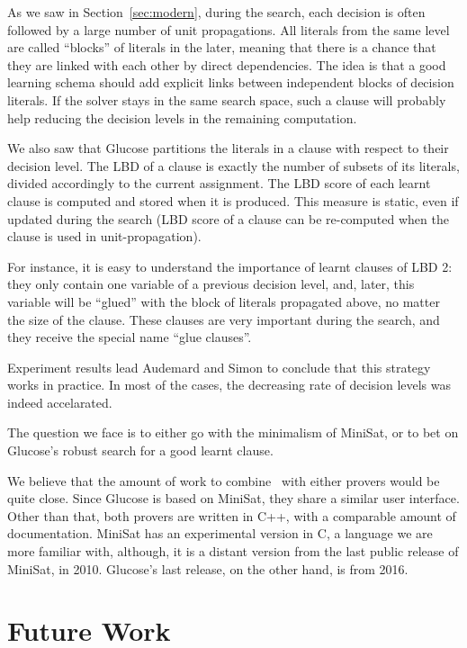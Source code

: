 As we saw in Section~\ref{sec:modern}, during the search, each decision is often
followed by a large number of unit propagations. All literals from the same
level are called ``blocks'' of literals in the later, meaning that there is a
chance that they are linked with each other by direct dependencies. The idea is
that a good learning schema should add explicit links between independent blocks
of decision literals. If the solver stays in the same search space, such a
clause will probably help reducing the decision levels in the remaining
computation.

We also saw that Glucose partitions the literals in a clause with respect to
their decision level. The LBD of a clause is exactly the number of subsets of
its literals, divided accordingly to the current assignment. The LBD score of
each learnt clause is computed and stored when it is produced. This measure is
static, even if updated during the search (LBD score of a clause can be
re-computed when the clause is used in unit-propagation). 

For instance, it is easy to understand the importance of learnt clauses of LBD
2: they only contain one variable of a previous decision level, and, later, this
variable will be ``glued'' with the block of literals propagated above, no
matter the size of the clause. These clauses are very important during the
search, and they receive the special name ``glue clauses''.

Experiment results lead Audemard and Simon to conclude that this strategy
works in practice. In most of the cases, the decreasing rate of decision
levels was indeed accelarated.

The question we face is to either go with the minimalism of MiniSat, or to
bet on Glucose's robust search for a good learnt clause.

We believe that the amount of work to combine \ksp~with either provers would be
quite close. Since Glucose is based on MiniSat, they share a similar user
interface. Other than that, both provers are written in C++, with a comparable
amount of documentation. MiniSat has an experimental version in C, a language we
are more familiar with, although, it is a distant version from the last public
release of MiniSat, in 2010. Glucose's last release, on the other hand, is from
2016. 


\section{Future Work}%
\label{sec:future}

